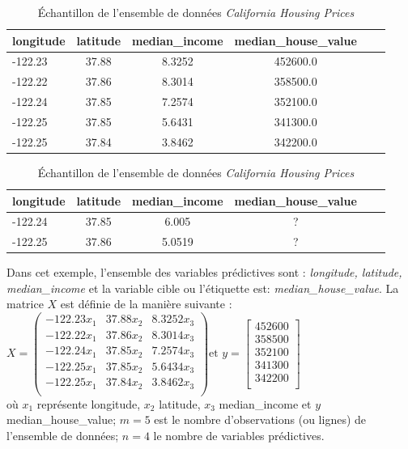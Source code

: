 \documentclass[12pt, french]{report}
\begin{document}
\begin{table}[h]
	\centering
	\begin{tabular}{|l|c|c|c|c|c|}
		\hline
		\textbf{longitude} & \textbf{latitude} & \textbf{median\_income} & \textbf{median\_house\_value}   \\
		\hline
		 	-122.23 & 37.88  & 8.3252	& 452600.0 \\
			-122.22 & 37.86 & 8.3014 & 358500.0 \\
			-122.24 & 37.85 & 7.2574 & 352100.0\\
			-122.25 & 37.85 & 5.6431 & 341300.0\\
			-122.25	& 37.84 & 3.8462 & 342200.0\\
		\hline
		
	\end{tabular}
	\caption{Échantillon de l'ensemble de données \textit{California Housing Prices}}
	\label{tab:CaliforniaHousingPricesTrain}
\end{table}

\begin{table}[h]
	\centering
	\begin{tabular}{|l|c|c|c|c|c|}
		\hline
		\textbf{longitude} & \textbf{latitude} & \textbf{median\_income} & \textbf{median\_house\_value}   \\
		\hline
		-122.24 & 37.85  & 6.005	& ? \\
		-122.25 & 37.86 & 5.0519 & ? \\
		\hline
		
	\end{tabular}
	\caption{Échantillon de l'ensemble de données \textit{California Housing Prices}}
	\label{tab:CaliforniaHousingPricesTest}
\end{table}

Dans cet exemple, l'ensemble des variables prédictives sont :  \textit{longitude, latitude, median\_income} et la variable cible ou l'étiquette est: \textit{median\_house\_value}. La matrice $X$ est définie de la manière suivante : \\
$ X=
	\begin{pmatrix}
		-122.23x_1 & 37.88x_2 & 8.3252x_3\\
		-122.22x_1 & 37.86x_2 & 8.3014x_3 \\
		-122.24x_1 & 37.85x_2 & 7.2574x_3 \\
		-122.25x_1 & 37.85x_2 & 5.6434x_3 \\
		-122.25x_1 & 37.84x_2 & 3.8462x_3 \\
	\end{pmatrix}
	\text{et }
	y=
	\begin{bmatrix}
		452600 \\
		358500 \\
		352100 \\
		341300 \\
		342200 \\
	\end{bmatrix}
$
\\
où $x_1$ représente longitude, $x_2$ latitude, $x_3$ median\_income et $y$ median\_house\_value; $m=5$ est le nombre d'observations (ou lignes) de l'ensemble de données; $n=4$ le nombre de variables prédictives. \\
\end{document}
